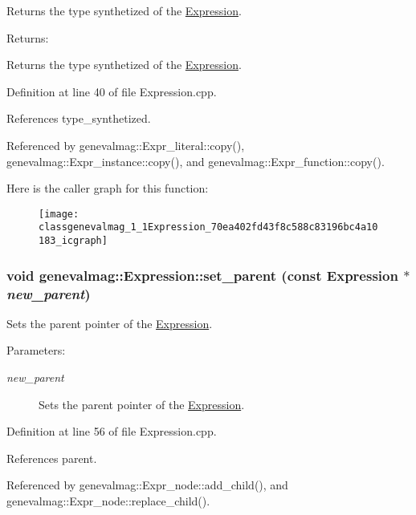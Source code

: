 Returns the type synthetized of the \hyperlink{classgenevalmag_1_1Expression}{Expression}. \begin{Desc}
\item[Returns:]\end{Desc}
Returns the type synthetized of the \hyperlink{classgenevalmag_1_1Expression}{Expression}. 

Definition at line 40 of file Expression.cpp.

References type\_\-synthetized.

Referenced by genevalmag::Expr\_\-literal::copy(), genevalmag::Expr\_\-instance::copy(), and genevalmag::Expr\_\-function::copy().

Here is the caller graph for this function:\nopagebreak
\begin{figure}[H]
\begin{center}
\leavevmode
\texttt{[image: classgenevalmag\_1\_1Expression\_70ea402fd43f8c588c83196bc4a10183\_icgraph]}
\end{center}
\end{figure}
\hypertarget{classgenevalmag_1_1Expression_cba3103fd864eacfefdecb88e597de1f}{
\subsubsection[{set\_\-parent}]{\setlength{\rightskip}{0pt plus 5cm}void genevalmag::Expression::set\_\-parent (const {\bf Expression} $\ast$ {\em new\_\-parent})}}
\label{classgenevalmag_1_1Expression_cba3103fd864eacfefdecb88e597de1f}


Sets the parent pointer of the \hyperlink{classgenevalmag_1_1Expression}{Expression}. \begin{Desc}
\item[Parameters:]
\begin{description}
\item[{\em new\_\-parent}]Sets the parent pointer of the \hyperlink{classgenevalmag_1_1Expression}{Expression}. \end{description}
\end{Desc}


Definition at line 56 of file Expression.cpp.

References parent.

Referenced by genevalmag::Expr\_\-node::add\_\-child(), and genevalmag::Expr\_\-node::replace\_\-child().

